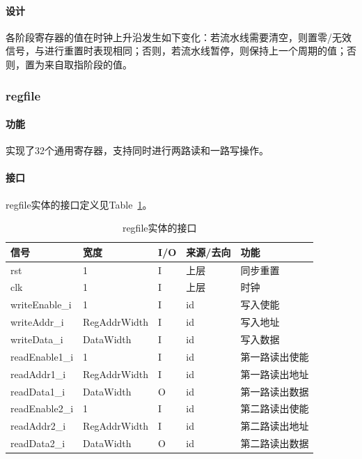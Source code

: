 \documentclass{article}
\begin{document}
\begin{spacing}{1.4}
\paragraph{设计}\mbox{}

各阶段寄存器的值在时钟上升沿发生如下变化：若流水线需要清空，则置零/无效信号，与进行重置时表现相同；否则，若流水线暂停，则保持上一个周期的值；否则，置为来自取指阶段的值。

\subsubsection{regfile}

\paragraph{功能}\mbox{}

实现了32个通用寄存器，支持同时进行两路读和一路写操作。

\paragraph{接口}\mbox{}

regfile实体的接口定义见Table~\ref{tb:regfile-interface}。
\begin{table}[!htb]
\begin{center}
\begin{tabular*}{15cm}{l|l|l|l|p{5cm}}
\hline
\textbf{信号}&\textbf{宽度}&\textbf{I/O}&\textbf{来源/去向}&\textbf{功能} \\
\hline rst                     & 1                      & I     & 上层          & 同步重置 \\
\hline clk                     & 1                      & I     & 上层          & 时钟 \\
\hline writeEnable\_i          & 1                      & I     & id            & 写入使能 \\
\hline writeAddr\_i            & RegAddrWidth           & I     & id            & 写入地址 \\
\hline writeData\_i            & DataWidth              & I     & id            & 写入数据 \\
\hline readEnable1\_i          & 1                      & I     & id            & 第一路读出使能 \\
\hline readAddr1\_i            & RegAddrWidth           & I     & id            & 第一路读出地址 \\
\hline readData1\_i            & DataWidth              & O     & id            & 第一路读出数据 \\
\hline readEnable2\_i          & 1                      & I     & id            & 第二路读出使能 \\
\hline readAddr2\_i            & RegAddrWidth           & I     & id            & 第二路读出地址 \\
\hline readData2\_i            & DataWidth              & O     & id            & 第二路读出数据 \\
\hline
\end{tabular*}
\caption{regfile实体的接口}
\label{tb:regfile-interface}
\end{center}
\end{table}


\end{spacing}
\end{document}
